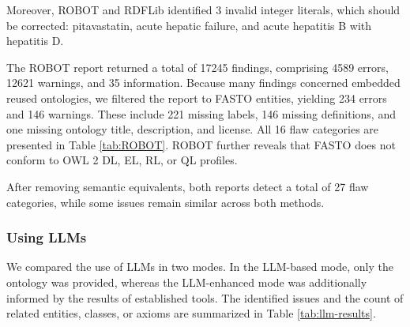 \documentclass[
]{ceurart}
\begin{document}
Moreover, ROBOT and RDFLib identified 3 invalid integer literals, which should be corrected: pitavastatin, acute hepatic failure, and acute hepatitis B with hepatitis D. 

The ROBOT report returned a total of 17245 findings, comprising 4589 errors, 12621 warnings, and 35 information. Because many findings concerned embedded reused ontologies, we filtered the report to FASTO entities, yielding 234 errors and 146 warnings. These include 221 missing labels, 146 missing definitions, and one missing ontology title, description, and license. All 16 flaw categories are presented in Table \ref{tab:ROBOT}. ROBOT further reveals that FASTO does not conform to OWL 2 DL, EL, RL, or QL profiles.

After removing semantic equivalents, both reports detect a total of 27 flaw categories, while some issues remain similar across both methods.  


\subsubsection{Using LLMs}

We compared the use of LLMs in two modes. In the LLM-based mode, only the ontology was provided, whereas the LLM-enhanced mode was additionally informed by the results of established tools. The identified issues and the count of related entities, classes, or axioms are summarized in Table \ref{tab:llm-results}.
\end{document}
